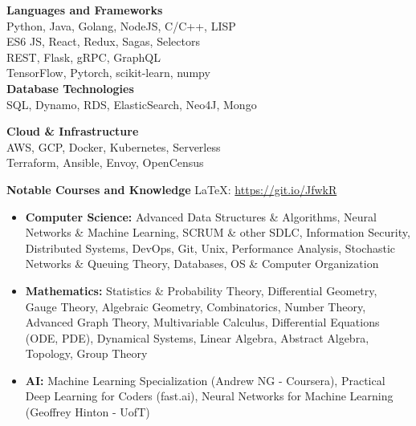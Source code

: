 \documentclass{article}
\newcommand{\centerbullet}{$\vcenter{\hbox{\tiny$\bullet$}} \ $}
\begin{document}
\begin{centering}
\vspace{-8pt}
\begin{multicols}{2}
{\bf Languages and Frameworks}\\
Python, Java, Golang, NodeJS, C/C++, LISP\\
ES6 JS, React, Redux, Sagas, Selectors \\
REST, Flask, gRPC, GraphQL  \\   
TensorFlow, Pytorch, scikit-learn, numpy\\
{ \bf Database Technologies}\\
SQL, Dynamo, RDS, ElasticSearch, Neo4J, Mongo

{\bf Cloud \& Infrastructure }\\
AWS, GCP, Docker, Kubernetes, Serverless \\
Terraform, Ansible, Envoy, OpenCensus
\end{multicols}
\end{centering}
\vspace{-10pt}
{\bf Notable Courses and Knowledge} \hfill \LaTeX: \url{https://git.io/JfwkR} 
\begin{itemize}[leftmargin=*]
\itemsep0em
\renewcommand\labelitemi{\tiny$\bullet$}
    \item {\bf{Computer Science:}} Advanced Data Structures \& Algorithms, Neural Networks \& Machine Learning, SCRUM \& other SDLC,  Information Security, Distributed Systems, DevOps, Git, Unix, Performance Analysis, Stochastic Networks \& Queuing Theory, Databases, OS \& Computer Organization 
    \item {\bf{Mathematics:}} Statistics \& Probability Theory, Differential Geometry, Gauge Theory, Algebraic Geometry, Combinatorics, Number Theory, Advanced Graph Theory, Multivariable Calculus, Differential Equations (ODE, PDE), Dynamical Systems, Linear Algebra, Abstract Algebra, Topology, Group Theory 
    \item \textbf{AI:} Machine Learning Specialization (Andrew NG - Coursera),  Practical Deep Learning for Coders (fast.ai),  Neural Networks for Machine Learning (Geoffrey Hinton - UofT)
\end{itemize}

\end{document}

